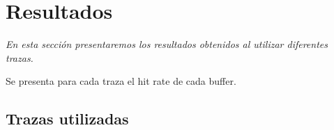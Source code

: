 \section{Resultados}

\textsl{En esta secci\'on presentaremos los resultados obtenidos 
al utilizar diferentes trazas. 
}

\vspace*{0.3cm}

Se presenta para cada traza el hit rate de cada buffer.

\subsection{Trazas utilizadas}


            
            
            


